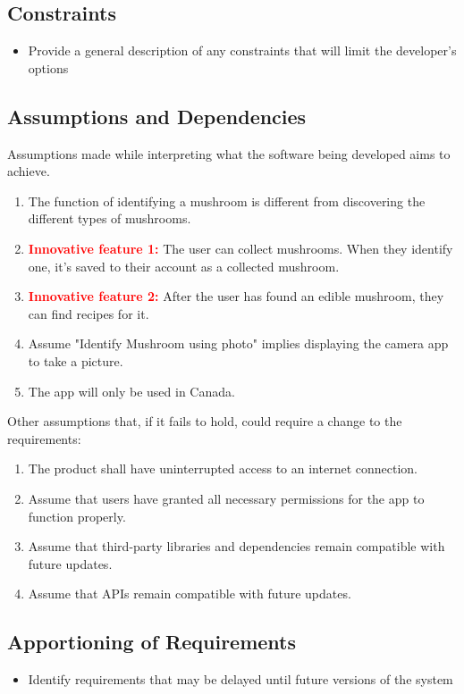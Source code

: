 \documentclass[]{article}
\begin{document}
\subsection{Constraints}
\label{sub:constraints}
\begin{itemize}
	\item Provide a general description of any constraints that will limit the developer's options
\end{itemize}

\subsection{Assumptions and Dependencies}
\label{sub:assumptions_and_dependencies}
Assumptions made while interpreting what the software being developed aims to achieve.
\begin{enumerate}
	\item The function of identifying a mushroom is different from discovering the different types of mushrooms.
	\item \textbf{\textcolor{red}{Innovative feature 1:}} The user can collect mushrooms. When they identify one, it's saved to their account as a collected mushroom.
	\item \textbf{\textcolor{red}{Innovative feature 2:}} After the user has found an edible mushroom, they can find recipes for it.
	\item Assume "Identify Mushroom using photo" implies displaying the camera app to take a picture.
	\item The app will only be used in Canada.
\end{enumerate}

Other assumptions that, if it fails to hold, could require a change to the requirements:
\begin{enumerate}
	\item The product shall have uninterrupted access to an internet connection.
    \item Assume that users have granted all necessary permissions for the app to function properly.
    \item Assume that third-party libraries and dependencies remain compatible with future updates.
    \item Assume that APIs remain compatible with future updates.
\end{enumerate}

\subsection{Apportioning of Requirements}
\label{sub:apportioning_of_requirements}
\begin{itemize}
	\item Identify requirements that may be delayed until future versions of the system
\end{itemize}
\end{document}
